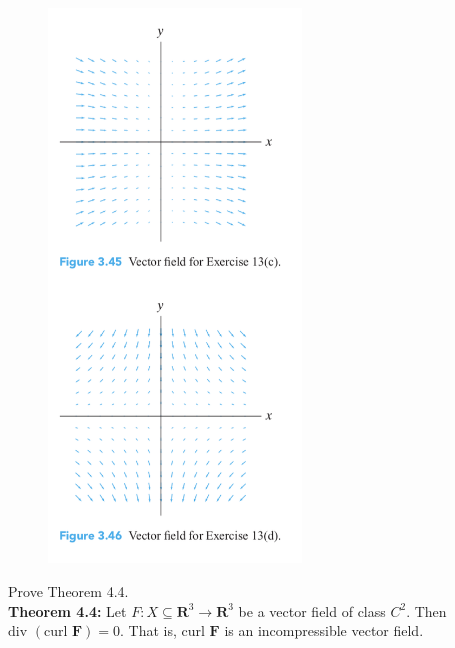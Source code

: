 \documentclass[12pt,letterpaper]{hmcpset}
\newcommand{\vb}{\mathbf}
\begin{document}
\begin{figure}[h]
\begin{minipage}{0.49\textwidth}
    \includegraphics[width=0.6\textwidth]{assets/11_2.png}
  \end{minipage}
\end{figure}
\clearpage

\begin{problem}[Colley 3.4.16]
  Prove Theorem 4.4. \\
  
  \textbf{Theorem 4.4:} Let $F: X \subseteq \vb R^3 \to \vb R^3$ be a vector field of class $C^2$.
  Then $\text{div } (\text{curl } \vb F) = 0$. That is, curl $\vb F$ is an incompressible vector field.
\end{problem}
\end{document}
